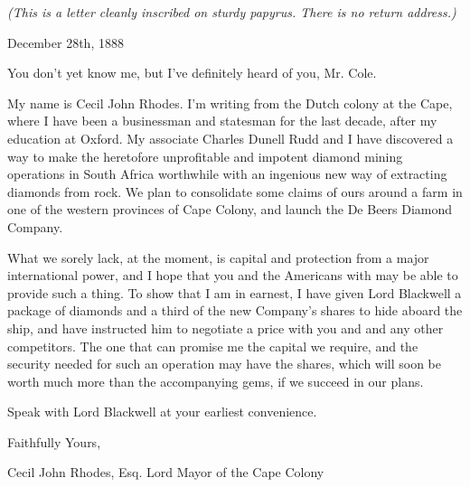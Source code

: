 \documentclass[white]{airship}
\begin{document}
\name{\wDeBeersAmerica{}} %
{\em (This is a letter cleanly inscribed on sturdy papyrus. There is no return address.)}

December 28th, 1888

You don't yet know me, but I've definitely heard of you, Mr. Cole.

My name is Cecil John Rhodes. I'm writing from the Dutch colony at the Cape, where I have been a businessman and statesman for the last decade, after my education at Oxford. My associate Charles Dunell Rudd and I have discovered a way to make the heretofore unprofitable and impotent diamond mining operations in South Africa worthwhile with an ingenious new way of extracting diamonds from rock. We plan to consolidate some claims of ours around a farm in one of the western provinces of Cape Colony, and launch the De Beers Diamond Company.

What we sorely lack, at the moment, is capital and protection from a major international power, and I hope that you and the Americans with may be able to provide such a thing. To show that I am in earnest, I have given Lord Blackwell a package of diamonds and a third of the new Company's shares to hide aboard the ship, and have instructed him to negotiate a price with you and and any other competitors. The one that can promise me the capital we require, and the security needed for such an operation may have the shares, which will soon be worth much more than the accompanying gems, if we succeed in our plans.

Speak with Lord Blackwell at your earliest convenience.

Faithfully Yours, 

Cecil John Rhodes, Esq.
Lord Mayor of the Cape Colony
\end{document}
